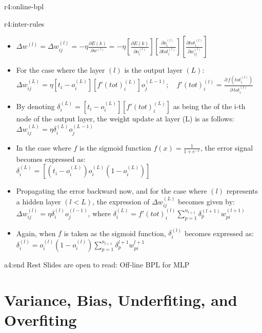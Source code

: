 \documentclass{tron}
\begin{document}
\begin{remark}{r4:online-bpl}
	\begin{remark}{r4:inter-rules}
		\begin{itemize}
			\item $\Delta w^{(l)} = \Delta w_{ij}^{(l)} = - \eta \frac{\partial E(k)}{\partial w^{(l)}} = - \eta [\frac{\partial E(k)}{\partial o_i^{(l)}}][\frac{\partial o_i^{(l)}}{\partial tot_i^{(l)}}][\frac{\partial tot_i^{(l)}}{\partial w_{ij}^{(l)}}]$
			\item For the case where the layer $(l)$ is the output layer $(L)$:\\ 
				$\Delta w_{ij}^{(L)} = \eta [t_i - o_i^{(L)}][f'(tot)_i ^{(L)}] o_j^{(L-1)} ; \quad f'(tot)_i^{(l)} = \frac{\partial \, f(tot_i^{(l)})}{\partial \, tot_i^{(l)}}$
			\item By denoting $\delta_i^{(L)} = [t_i - o_i^{(L)}][f'(tot)_i ^{(L)}]$ as being the  of the i-th node of the output layer, the weight update at layer (L) is as follows: $\Delta w_{ij}^{(L)} = \eta \delta_i^{(L)} o_j^{(L-1)}$
			\item In the case where $f$ is the sigmoid function $f(x) = \frac{1}{1 + e^{-x}}$, the error signal becomes expressed as: \\ $\delta_i^{(L)} = [(t_i - o_i^{(L)})o_i^{(L)}(1-o_i^{(L)})]$
			\item Propagating the error backward now, and for the case where $(l)$ represents a hidden layer $(l < L)$, the expression of $\Delta w_{ij}^{(L)}$ becomes given by: $\Delta w_{ij}^{(l)} = \eta \delta_i^{(l)} o_j^{(l-1)}$, where $\delta_i^{(L)} = f' (tot)_i^{(l)} \sum_{p=1}^{n_{l+1}} \delta_p^{(l+1)} w_{pi}^{(l+1)}$
			\item Again, when $f$ is taken as the sigmoid function, $\delta_i^{(l)}$ becomes expressed as: \\
				$\delta_i^{(l)} = o_i^{(l)} (1-o_i^{(l)}) \sum_{p=1}^{n_{l+1}} \delta_p^{l+1} w_{pi}^{l+1}$
		\end{itemize}
	\end{remark}
\end{remark}

\begin{alert}[...]{a4:end}
	Rest Slides are open to read: Off-line BPL for MLP
\end{alert}

\newpage
\section{Variance, Bias, Underﬁting, and Overﬁting}
\end{document}
